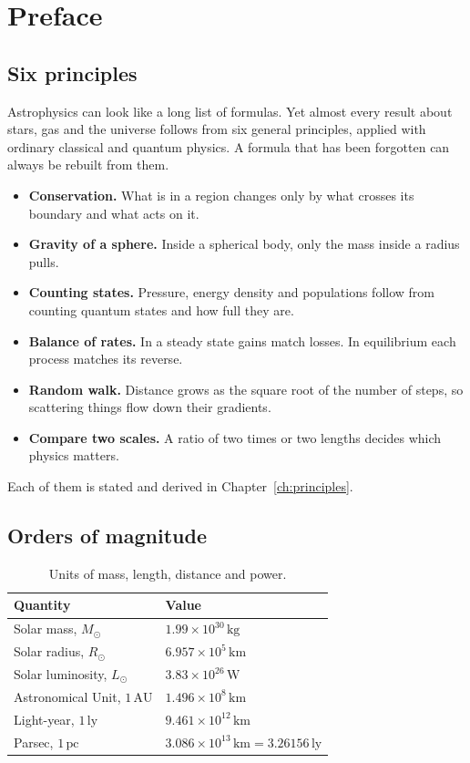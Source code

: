 \chapter*{Preface}

\section*{Six principles}

Astrophysics can look like a long list of formulas. Yet almost every result about stars, gas and the universe follows from six general principles, applied with ordinary classical and quantum physics. A formula that has been forgotten can always be rebuilt from them.
\begin{itemize}[leftmargin=2.2em, itemsep=0.2em]
	\item[P1] \textbf{Conservation.} What is in a region changes only by what crosses its boundary and what acts on it.
	\item[P2] \textbf{Gravity of a sphere.} Inside a spherical body, only the mass inside a radius pulls.
	\item[P3] \textbf{Counting states.} Pressure, energy density and populations follow from counting quantum states and how full they are.
	\item[P4] \textbf{Balance of rates.} In a steady state gains match losses. In equilibrium each process matches its reverse.
	\item[P5] \textbf{Random walk.} Distance grows as the square root of the number of steps, so scattering things flow down their gradients.
	\item[P6] \textbf{Compare two scales.} A ratio of two times or two lengths decides which physics matters.
\end{itemize}
Each of them is stated and derived in Chapter~\ref{ch:principles}.

\section*{Orders of magnitude}

\begin{table}[htbp]
	\centering
	\begin{tabular}{@{}l l@{}}
		\toprule
		\textbf{Quantity} & \textbf{Value} \\
		\midrule
		Solar mass, $M_\odot$ & $1.99 \times 10^{30}\,\mathrm{kg}$ \\
		Solar radius, $R_\odot$ & $6.957 \times 10^{5}\,\mathrm{km}$ \\
		Solar luminosity, $L_\odot$ & $3.83 \times 10^{26}\,\mathrm{W}$ \\
		Astronomical Unit, $1\,\mathrm{AU}$ & $1.496 \times 10^{8}\,\mathrm{km}$ \\
		Light-year, $1\,\mathrm{ly}$ & $9.461 \times 10^{12}\,\mathrm{km}$ \\
		Parsec, $1\,\mathrm{pc}$ & $3.086 \times 10^{13}\,\mathrm{km} = 3.26156\,\mathrm{ly}$ \\
		\bottomrule
	\end{tabular}
	\caption{Units of mass, length, distance and power.}
	\label{tab:preface_units}
\end{table}

